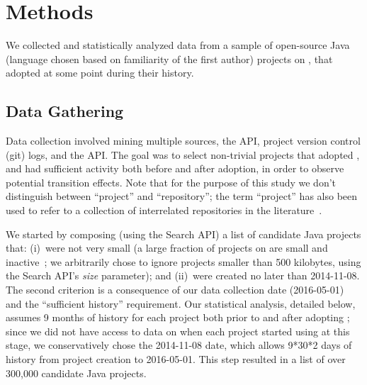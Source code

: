 
\section{Methods}
\label{sec:method}

We collected and statistically analyzed data from a sample of open-source 
Java (language chosen based on familiarity of the first author) projects on 
\GH, that adopted \Tvis at some point during their history.

\subsection{Data Gathering}

Data collection involved mining multiple sources, the \GH API, project version 
control (git) logs, and the \Tvis API.
The goal was to select non-trivial projects that adopted \Tvis, and had sufficient
activity both before and after adoption, in order to observe potential transition effects.
Note that for the purpose of this study we don't distinguish between ``project'' 
and ``repository''; the term ``project'' has also been used to refer to a collection 
of interrelated repositories in the literature~\cite{vasilescu2016sky}.

We started by composing (using the \GH Search API) a list of candidate Java 
projects that: (i)~were not very small (a large fraction of projects on \GH are 
small and inactive~\cite{gousios2014exploratory}; we arbitrarily chose to ignore
projects smaller than 500 kilobytes, using the \GH Search API's \emph{size} 
parameter); and (ii)~were created no later than 2014-11-08. 
The second criterion is a consequence of our data collection date (2016-05-01)
and the ``sufficient history'' requirement. 
Our statistical analysis, detailed below, assumes 9 months of history for each
project both prior to and after adopting \Tvis; since we did not have access to
data on when each project started using \Tvis at this stage, we conservatively
chose the 2014-11-08 date, which allows 9*30*2 days of history from project 
creation to 2016-05-01.
This step resulted in a list of over 300,000 candidate Java projects.

